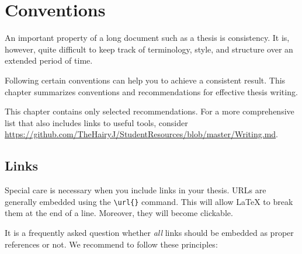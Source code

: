 
\chapter{Conventions} %

\label{Chapter2} %


\renewcommand{\keyword}[1]{\textbf{#1}}
\renewcommand{\tabhead}[1]{\textbf{#1}}
\renewcommand{\code}[1]{\texttt{#1}}
\renewcommand{\file}[1]{\texttt{#1}}
\renewcommand{\option}[1]{\texttt{\itshape#1}}




An important property of a long document such as a thesis is consistency.%
It is, however, quite difficult to keep track of terminology, style, and structure over an extended period of time.

Following certain conventions can help you to achieve a consistent result. This chapter summarizes conventions and recommendations for effective thesis writing.

This chapter contains only selected recommendations. For a more comprehensive list that also includes links to useful tools, consider \url{https://github.com/TheHairyJ/StudentResources/blob/master/Writing.md}.

\section{Links}

Special care is necessary when you include links in your thesis. URLs are generally embedded using the \verb|\url{}| command. This will allow LaTeX to break them at the end of a line. Moreover, they will become clickable.

It is a frequently asked question whether \emph{all} links should be embedded as proper references or not. We recommend to follow these principles:%

